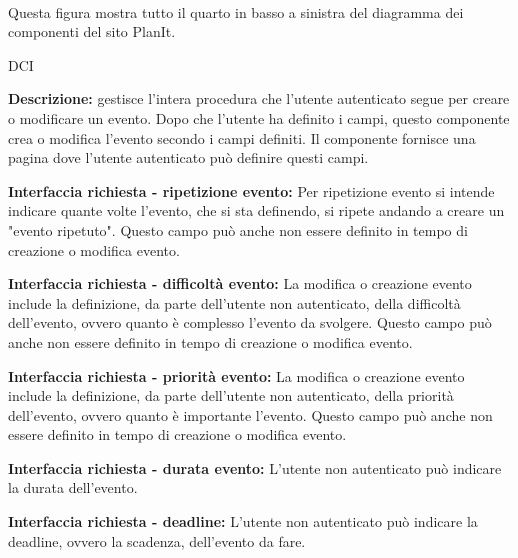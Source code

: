 \begin{center}
    \\
    Questa figura mostra tutto il quarto in basso a sinistra del diagramma dei componenti del sito PlanIt.
\end{center}
\newpage
\begin{listaPersonale}{DCI}

    \textbf{Descrizione:} gestisce l'intera procedura che l'utente autenticato segue per creare o modificare un evento. Dopo che l'utente ha definito i campi, questo componente crea o modifica l'evento secondo i campi definiti.  Il componente fornisce una pagina dove l'utente autenticato può definire questi campi.

    \textbf{Interfaccia richiesta - ripetizione evento:} Per ripetizione evento si intende indicare quante volte l'evento, che si sta definendo, si ripete andando a creare un "evento ripetuto". Questo campo può anche non essere definito in tempo di creazione o modifica evento.

    \textbf{Interfaccia richiesta - difficoltà evento:} La modifica o creazione evento include la definizione, da parte dell'utente non autenticato, della difficoltà dell'evento, ovvero quanto è complesso l'evento da svolgere. Questo campo può anche non essere definito in tempo di creazione o modifica evento.

    \textbf{Interfaccia richiesta - priorità evento:} La modifica o creazione evento include la definizione, da parte dell'utente non autenticato, della priorità dell'evento, ovvero quanto è importante l'evento. Questo campo può anche non essere definito in tempo di creazione o modifica evento.

    \textbf{Interfaccia richiesta - durata evento:} L'utente non autenticato può indicare la durata dell'evento.

    \textbf{Interfaccia richiesta - deadline:} L'utente non autenticato può indicare la deadline, ovvero la scadenza, dell'evento da fare.


\end{listaPersonale}
